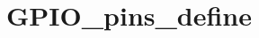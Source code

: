 \hypertarget{group___g_p_i_o__pins__define}{\section{G\-P\-I\-O\-\_\-pins\-\_\-define}
\label{group___g_p_i_o__pins__define}
}
